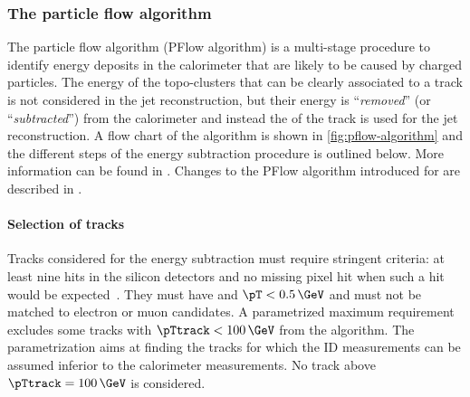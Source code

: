 




\subsubsection{The particle flow algorithm}
The particle flow algorithm (PFlow algorithm) is a multi-stage procedure to identify energy deposits in the calorimeter that are likely to be caused by charged particles. The energy of the topo-clusters that can be clearly associated to a track is not considered in the jet reconstruction, but their energy is ``\emph{removed}'' (or ``\emph{subtracted}'') from the calorimeter and instead the \pT of the track is used for the jet reconstruction. A flow chart of the algorithm is shown in \cref{fig:pflow-algorithm} and the different steps of the energy subtraction procedure is outlined below. More information can be found in . Changes to the PFlow algorithm introduced for \RunTwo are described in .

\paragraph{Selection of tracks} Tracks considered for the energy subtraction must require stringent criteria: at least nine hits in the silicon detectors and no missing pixel hit when such a hit would be expected~\cite{PERF-2015-09}. They must have  and $\pT < 0.5\,\GeV$ and must not be matched to electron or muon candidates. A parametrized maximum \pTtrack requirement excludes some tracks with $\pTtrack < 100\,\GeV$ from the algorithm. The parametrization aims at finding the tracks for which the ID measurements can be assumed inferior to the calorimeter measurements. No track above $\pTtrack = 100\,\GeV$ is considered.

